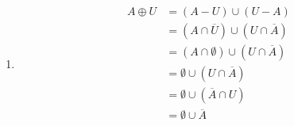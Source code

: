 \documentclass[12pt letter]{report}
\begin{document}
{\begin{enumerate}
\begin{align*}
{            Difference}                                                                                                                           \\
                               & = \left( A \cap U \right) \cup \left( \emptyset \cap \overline{A} \right) \tag*{Complementation of an Empty
            set}                                                                                                                                  \\
                               & = \left( A \right) \cup \left( \emptyset \cap \overline{A} \right) \tag*{By First Identity Law}                  \\
                               & = A \cup \left( \overline{A} \cap \emptyset \right) \tag*{By Second Commutative Law}                             \\
                               & = A \cup \emptyset \tag*{By Second Domination Law}                                                               \\
                               & = A \tag*{By Second Identity Law}                                                                                \\
          \end{align*}
          Hence $A \oplus \emptyset = A$
    \item
          \begin{align*}
            A \oplus U & = \left( A - U \right) \cup \left( U - A \right) \tag*{Definition of Symmetric Difference}             \\
                       & = \left( A \cap \overline{U} \right) \cup \left( U \cap \overline{A} \right) \tag*{Definition of
            Difference}                                                                                                         \\
                       & = \left( A \cap \emptyset \right) \cup \left( U \cap \overline{A} \right) \tag*{Complementation of the
            Universal set}                                                                                                      \\
                       & = \emptyset \cup \left( U \cap \overline{A} \right) \tag*{By Second Domination Law }                   \\
                       & = \emptyset \cup \left( \overline{A} \cap U  \right) \tag*{By Second Commutative Law}                  \\
                       & = \emptyset \cup \overline{A} \tag*{By First Identity Law}                                             \\

\end{align*}
\end{enumerate}}
\end{document}
